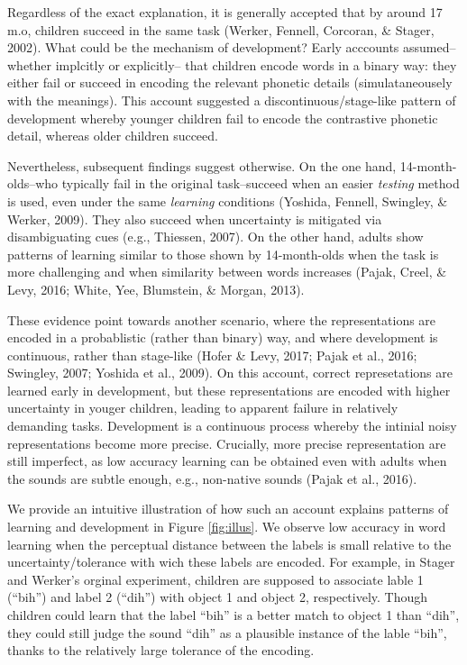 \documentclass[10pt, letterpaper]{article}
\begin{document}
Regardless of the exact explanation, it is generally accepted that by
around 17 m.o, children succeed in the same task (Werker, Fennell,
Corcoran, \& Stager, 2002). What could be the mechanism of development?
Early acccounts assumed--whether implcitly or explicitly-- that children
encode words in a binary way: they either fail or succeed in encoding
the relevant phonetic details (simulataneousely with the meanings). This
account suggested a discontinuous/stage-like pattern of development
whereby younger children fail to encode the contrastive phonetic detail,
whereas older children succeed.

Nevertheless, subsequent findings suggest otherwise. On the one hand,
14-month-olds--who typically fail in the original task--succeed when an
easier \emph{testing} method is used, even under the same
\emph{learning} conditions (Yoshida, Fennell, Swingley, \& Werker,
2009). They also succeed when uncertainty is mitigated via
disambiguating cues (e.g., Thiessen, 2007). On the other hand, adults
show patterns of learning similar to those shown by 14-month-olds when
the task is more challenging and when similarity between words increases
(Pajak, Creel, \& Levy, 2016; White, Yee, Blumstein, \& Morgan, 2013).

These evidence point towards another scenario, where the representations
are encoded in a probablistic (rather than binary) way, and where
development is continuous, rather than stage-like (Hofer \& Levy, 2017;
Pajak et al., 2016; Swingley, 2007; Yoshida et al., 2009). On this
account, correct represetations are learned early in development, but
these representations are encoded with higher uncertainty in youger
children, leading to apparent failure in relatively demanding tasks.
Development is a continuous process whereby the intinial noisy
representations become more precise. Crucially, more precise
representation are still imperfect, as low accuracy learning can be
obtained even with adults when the sounds are subtle enough, e.g.,
non-native sounds (Pajak et al., 2016).

We provide an intuitive illustration of how such an account explains
patterns of learning and development in Figure \ref{fig:illus}. We
observe low accuracy in word learning when the perceptual distance
between the labels is small relative to the uncertainty/tolerance with
wich these labels are encoded. For example, in Stager and Werker's
orginal experiment, children are supposed to associate lable 1 (``bih'')
and label 2 (``dih'') with object 1 and object 2, respectively. Though
children could learn that the label ``bih'' is a better match to object
1 than ``dih'', they could still judge the sound ``dih'' as a plausible
instance of the lable ``bih'', thanks to the relatively large tolerance
of the encoding.
\end{document}
